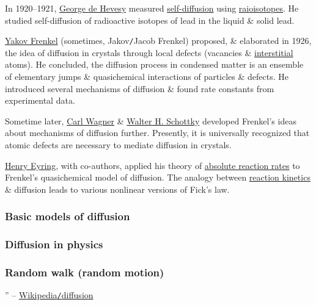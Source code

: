 \documentclass{article}
\begin{document}
In 1920--1921, \href{https://en.wikipedia.org/wiki/George_de_Hevesy}{\sc George de Hevesy} measured \href{https://en.wikipedia.org/wiki/Self-diffusion}{self-diffusion} using \href{https://en.wikipedia.org/wiki/Radioisotope}{raioisotopes}. He studied self-diffusion of radioactive isotopes of lead in the liquid \& solid lead.

\href{https://en.wikipedia.org/wiki/Yakov_Frenkel}{\sc Yakov Frenkel} (sometimes, Jakov{\tt/}Jacob Frenkel) proposed, \& elaborated in 1926, the idea of diffusion in crystals through local defects (vacancies \& \href{https://en.wikipedia.org/wiki/Interstitial_defect}{interstitial} atoms). He concluded, the diffusion process in condensed matter is an ensemble of elementary jumps \& quasichemical interactions of particles \& defects. He introduced several mechanisms of diffusion \& found rate constants from experimental data.

Sometime later, \href{https://en.wikipedia.org/wiki/Carl_Wagner}{\sc Carl Wagner} \& \href{https://en.wikipedia.org/wiki/Walter_H._Schottky}{\sc Walter H. Schottky} developed Frenkel's ideas about mechanisms of diffusion further. Presently, it is universally recognized that atomic defects are necessary to mediate diffusion in crystals.

\href{https://en.wikipedia.org/wiki/Henry_Eyring_(chemist)}{\sc Henry Eyring}, with co-authors, applied his theory of \href{https://en.wikipedia.org/wiki/Transition_state_theory}{absolute reaction rates} to Frenkel's quasichemical model of diffusion. The analogy between \href{https://en.wikipedia.org/wiki/Chemical_kinetics}{reaction kinetics} \& diffusion leads to various nonlinear versions of Fick's law.

\subsubsection{Basic models of diffusion}

\subsubsection{Diffusion in physics}

\subsubsection{Random walk (random motion)}

'' -- \href{https://en.wikipedia.org/wiki/Diffusion}{Wikipedia{\tt/}diffusion}
\end{document}
